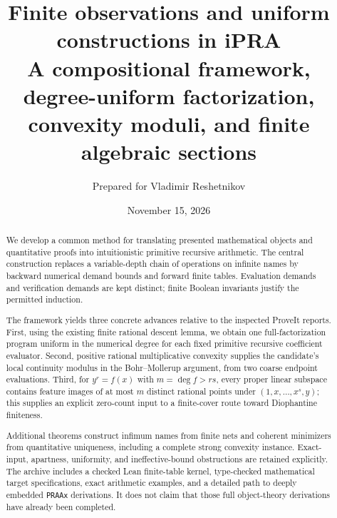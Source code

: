 \documentclass[11pt,letterpaper]{article}
\title{\textbf{Finite observations and uniform\\constructions in iPRA}\\[7pt]
\large A compositional framework, degree-uniform factorization,\\
convexity moduli, and finite algebraic sections}
\author{Prepared for Vladimir Reshetnikov}
\date{November 15, 2026}
\theoremstyle{definition}\newtheorem{definition}[theorem]{Definition}
\theoremstyle{remark}\newtheorem{remark}[theorem]{Remark}
\begin{document}
\maketitle
\begin{abstract}
We develop a common method for translating presented mathematical objects
and quantitative proofs into intuitionistic primitive recursive arithmetic.
The central construction replaces a variable-depth chain of operations on
infinite names by backward numerical demand bounds and forward finite
tables. Evaluation demands and verification demands are kept distinct;
finite Boolean invariants justify the permitted induction.

The framework yields three concrete advances relative to the inspected
ProveIt reports. First, using the existing finite rational descent lemma,
we obtain one full-factorization program uniform in the numerical degree
for each fixed primitive recursive coefficient evaluator. Second,
positive rational multiplicative convexity supplies the candidate's local
continuity modulus in the Bohr--Mollerup argument, from two coarse
endpoint evaluations. Third, for $y^r=f(x)$ with $m=\deg f>rs$, every
proper linear subspace contains feature images of at most $m$ distinct
rational points under $(1,x,\ldots,x^s,y)$; this supplies an explicit
zero-count input to a finite-cover route toward Diophantine finiteness.

Additional theorems construct infimum names from finite nets and coherent
minimizers from quantitative uniqueness, including a complete strong
convexity instance. Exact-input, apartness, uniformity, and ineffective-bound
obstructions are retained explicitly. The archive includes a checked Lean
finite-table kernel, type-checked mathematical target specifications,
exact arithmetic examples, and a detailed path to deeply embedded
\texttt{PRAAx} derivations. It does not claim that those full object-theory
derivations have already been completed.
\end{abstract}
\newpage
\tableofcontents
\newpage










\end{document}
